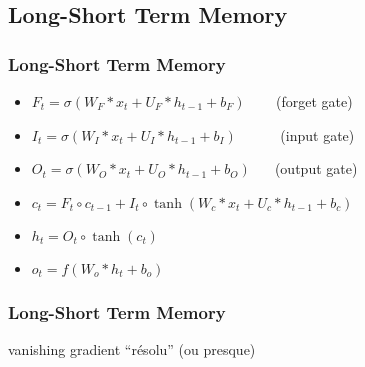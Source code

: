 \subsection{Long-Short Term Memory}



\begin{frame}
  \frametitle{Long-Short Term Memory}
  \begin{itemize}
  \item $F_{t}=\sigma (W_{F}*x_{t}+U_{F}*h_{t-1}+b_{F})\;\;\;\;\;\;\,$ (forget gate)
  \item $I_{t} =\sigma (W_{I}*x_{t}+U_{I}*h_{t-1}+b_{I})\;\;\;\;\;\;\;\;\;\;$ (input gate)
  \item $O_{t} =\sigma (W_{O}*x_{t}+U_{O}*h_{t-1}+b_{O})\;\;\;\;\;$ (output gate)
  \item $c_{t} =F_{t}\circ c_{t-1}+I_{t}\circ \tanh(W_{c}*x_{t}+U_{c}*h_{t-1}+b_{c})$
  \item $h_{t} =O_{t}\circ \tanh(c_{t})$
  \item $o_{t} =f(W_{o}*h_{t}+b_{o})$
  \end{itemize}
\end{frame}

\begin{frame}
  \frametitle{Long-Short Term Memory}
  vanishing gradient ``résolu'' (ou presque)
\end{frame}

